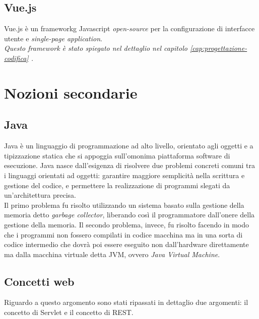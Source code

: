 \subsection{Vue.js}
\label{subsec:vue.js}

Vue.js è un \gls{frameworkg} Javascript \textit{open-source} per la configurazione di interfacce utente e \textit{single-page application}.\\

\textit{Questo framework è stato spiegato nel dettaglio nel capitolo \ref{cap:progettazione-codifica} .}

\section{Nozioni secondarie}
\label{sec:nozioni-secondarie}

\subsection{Java}
\label{subsec:java}

Java è un linguaggio di programmazione ad alto livello, orientato agli oggetti e a tipizzazione statica che si appoggia sull'omonima piattaforma software di esecuzione. Java nasce dall'esigenza di risolvere due problemi concreti comuni tra i linguaggi orientati ad oggetti: garantire maggiore semplicità nella scrittura e gestione del codice, e permettere la realizzazione di programmi slegati da un'architettura precisa.\\
Il primo problema fu risolto utilizzando un sistema basato sulla gestione della memoria detto \textit{garbage collector}, liberando così il programmatore dall'onere della gestione della memoria. Il secondo problema, invece, fu risolto facendo in modo che i programmi non fossero compilati in codice macchina ma in una sorta di codice intermedio che dovrà poi essere eseguito non dall'hardware direttamente ma dalla macchina virtuale detta JVM, ovvero \textit{Java Virtual Machine}.\\

\subsection{Concetti web}
\label{subsec:concetti-web}

Riguardo a questo argomento sono stati ripassati in dettaglio due argomenti: il concetto di Servlet e il concetto di REST.

